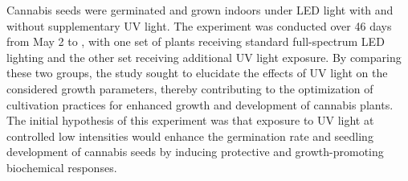 Cannabis seeds were germinated and grown indoors under LED light with and without supplementary UV light. The experiment was conducted over \num[mode=text]{46} days from May 2 to , with one set of plants receiving standard full-spectrum LED lighting and the other set receiving additional UV light exposure. By comparing these two groups, the study sought to elucidate the effects of UV light on the considered growth parameters, thereby contributing to the optimization of cultivation practices for enhanced growth and development of cannabis plants. The initial hypothesis of this experiment was that exposure to UV light at controlled low intensities would enhance the germination rate and seedling development of cannabis seeds by inducing protective and growth-promoting biochemical responses.

